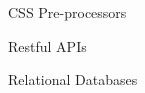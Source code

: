 \begin{minipage}[t]{0.3\textwidth}
\begin{cvskills}

  \cvskill
    {}
    {CSS Pre-processors}

 
\end{cvskills}
\end{minipage}%
\begin{minipage}[t]{0.3\textwidth}
\begin{cvskills}

  \cvskill
    {}
    {Restful APIs}

 
\end{cvskills}
\end{minipage}%
\begin{minipage}[t]{0.3\textwidth}
\begin{cvskills}

  \cvskill
    {}
    {Relational Databases}

 
\end{cvskills}
\end{minipage}


